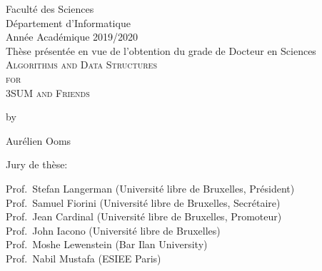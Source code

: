 
\thispagestyle{ulb_header_style}
\vspace*{\fill}
\begin{center}
Facult\'{e} des Sciences\\[1.5pt]
D\'{e}partement d'Informatique \\[1.5pt]
Ann\'{e}e Acad\'{e}mique 2019/2020 \\[1cm]
Th\`{e}se pr\'{e}sent\'{e}e en vue de l'obtention du grade de Docteur en Sciences \\[2cm]
{\scshape\huge Algorithms and Data Structures}\\[12pt]
{\scshape\huge for}\\[12pt]
{\scshape\huge 3SUM and Friends}
\end{center}

\begin{center}
\vspace{1cm}
{\small by}
\end{center}

\begin{center}
\vspace{0.5cm}
{\large Aurélien Ooms} \\[2cm]
\end{center}

\begin{center}
	Jury de th\`{e}se:
\end{center}
\begin{flushleft}
Prof.~Stefan Langerman (Université libre de Bruxelles, Président) \\
Prof.~Samuel Fiorini (Université libre de Bruxelles, Secrétaire) \\
Prof.~Jean Cardinal (Université libre de Bruxelles, Promoteur) \\
Prof.~John Iacono (Université libre de Bruxelles) \\
Prof.~Moshe Lewenstein (Bar Ilan University) \\
Prof.~Nabil Mustafa (ESIEE Paris)
\end{flushleft}
\vspace*{\fill}
